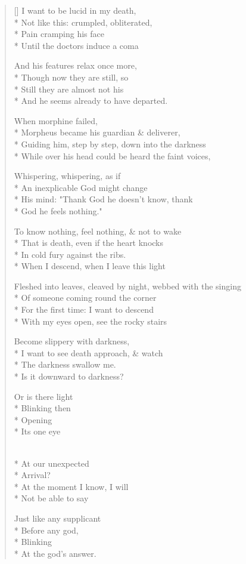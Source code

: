 \label{ch:deliverance}
\settowidth{\versewidth}{Fleshed into leaves, cleaved by night, webbed with the singing}
\begin{verse}[\versewidth]
I want to be lucid in my death,\\*
Not like this: crumpled, obliterated,\\*
Pain cramping his face\\*
Until the doctors induce a coma

And his features relax once more,\\*
Though now they are still, so\\*
Still they are almost not his\\*
And he seems already to have departed.

                                     When morphine failed,\\*
Morpheus became his guardian \& deliverer,\\*
Guiding him, step by step, down into the darkness\\*
While over his head could be heard the faint voices,

Whispering, whispering, as if\\*
An inexplicable God might change\\*
His mind: "Thank God he doesn't know, thank\\*
God he feels nothing."

To know nothing, feel nothing, \& not to wake\\*
That is death, even if the heart knocks\\*
In cold fury against the ribs.\\*
When I descend, when I leave this light

Fleshed into leaves, cleaved by night, webbed with the singing\\*
Of someone coming round the corner \\*
For the first time: I want to descend\\*
With my eyes open, see the rocky stairs

Become slippery with darkness,\\*
I want to see death approach, \& watch\\*
The darkness swallow me.\\*
Is it downward to darkness?

Or is there light\\*
Blinking then\\*
Opening\\*
Its one eye

\\*
At our unexpected\\*
Arrival?\\*
At the moment I know, I will\\*
Not be able to say

Just like any supplicant\\*
Before any god,\\*
Blinking\\*
At the god's answer.
\end{verse}
